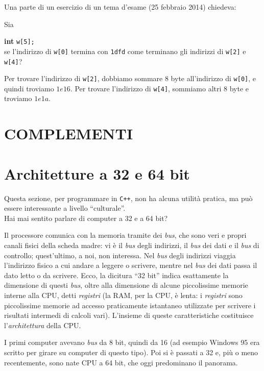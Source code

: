 	Una parte di un esercizio di un tema d'esame (25 febbraio 2014) chiedeva:
\begin{shaded}
Sia
 
\qquad\textbf{int} \verb|w[5];|\\
se l'indirizzo di \verb|w[0]| termina con \verb|1dfd| come terminano gli indirizzi 
di \verb|w[2]| e \verb|w[4]|?
\end{shaded}
Per trovare l'indirizzo di \verb|w[2]|, dobbiamo sommare 8 byte all'indirizzo di \verb|w[0]|, e quindi troviamo $1e16$. Per trovare l'indirizzo di \verb|w[4]|, sommiamo altri 8 byte e troviamo $1e1a$.
\begin{subappendices}
	\section*{COMPLEMENTI}
\section{Architetture a 32 e 64 bit}\label{archCPU}
Questa sezione, per programmare in \verb|C++|, non ha alcuna utilità  pratica, ma può essere interessante a livello ``culturale''.\\

Hai mai sentito parlare di computer a 32 e a 64 bit? 

Il processore comunica con la memoria tramite dei \emph{bus}, che sono veri e propri canali fisici della scheda madre: vi è il \emph{bus} degli indirizzi, il \emph{bus} dei dati e il \emph{bus} di controllo; quest'ultimo, a noi, non interessa. Nel \emph{bus} degli indirizzi viaggia l'indirizzo fisico a cui andare a leggere o scrivere, mentre nel \emph{bus} dei dati passa il dato letto o da scrivere. Ecco, la dicitura ``32 bit'' indica esattamente la dimensione di questi \emph{bus}, oltre alla dimensione di alcune piccolissime memorie interne alla CPU, detti \emph{registri} (la RAM, per la CPU, è lenta: i \emph{registri} sono piccolissime memorie ad accesso praticamente istantaneo utilizzate per scrivere i risultati intermedi di calcoli vari). L'insieme di queste caratteristiche costituisce l'\emph{architettura} della CPU. 

I primi computer avevano \emph{bus} da 8 bit, quindi da 16 (ad esempio Windows 95 era scritto per girare su computer di questo tipo). Poi si è passati a 32 e, più o meno recentemente, sono nate CPU a 64 bit, che oggi predominano il panorama.


\end{subappendices}
